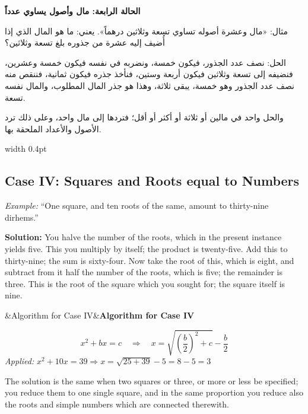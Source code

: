 \documentclass[11pt,a4paper,openany,oneside]{book}
\newenvironment{mathbox}[1][]{%
  \smallskip\par\noindent
  \begin{lrbox}{\mathboxsave}
  \begin{minipage}{\dimexpr\linewidth-2\fboxsep-2\fboxrule\relax}%
  \setlength{\parskip}{0.3em}%
  \ifx&#1&\else\textbf{#1}\\[0.2cm]\fi
}{%
  \end{minipage}%
  \end{lrbox}
  \fcolorbox{sectioncolor}{mathbg}{\usebox{\mathboxsave}}%
  \smallskip}
\begin{document}
\noindent\begin{minipage}[t]{0.48\textwidth}
\raggedleft

\begin{Arabic}
\textbf{الحالة الرابعة: مال وأصول يساوي عدداً}

مثال: «مال وعشرة أصوله تساوي تسعة وثلاثين درهماً». يعني: ما هو المال الذي إذا أُضيف إليه عشرة من جذوره بلغ تسعة وثلاثين؟

الحل: نصف عدد الجذور، فيكون خمسة، ونضربه في نفسه فيكون خمسة وعشرين، فنضيفه إلى تسعة وثلاثين فيكون أربعة وستين، فنأخذ جذره فيكون ثمانية، فننقص منه نصف عدد الجذور وهو خمسة، يبقى ثلاثة، وهذا هو جذر المال المطلوب، والمال نفسه تسعة.

والحل واحد في مالين أو ثلاثة أو أكثر أو أقل؛ فتردها إلى مال واحد، وعلى ذلك ترد الأصول والأعداد الملحقة بها.
\end{Arabic}

\end{minipage}%
\hfill\vrule width 0.4pt\hfill
\begin{minipage}[t]{0.48\textwidth}
\raggedright

\subsection*{Case IV: Squares and Roots equal to Numbers}

\textit{Example:} ``One square, and ten roots of the same, amount to thirty-nine dirhems.''

\textbf{Solution:} You halve the number of the roots, which in the present instance yields five. This you multiply by itself; the product is twenty-five. Add this to thirty-nine; the sum is sixty-four. Now take the root of this, which is eight, and subtract from it half the number of the roots, which is five; the remainder is three. This is the root of the square which you sought for; the square itself is nine.

\begin{mathbox}[Algorithm for Case IV]
\begin{equation}
x^2 + bx = c \quad\Longrightarrow\quad x = \sqrt{\left(\frac{b}{2}\right)^2 + c} - \frac{b}{2}
\end{equation}
\textit{Applied:} $x^2 + 10x = 39 \Rightarrow x = \sqrt{25 + 39} - 5 = 8 - 5 = 3$
\end{mathbox}

The solution is the same when two squares or three, or more or less be specified; you reduce them to one single square, and in the same proportion you reduce also the roots and simple numbers which are connected therewith.

\end{minipage}
\vspace{0.3cm}
\end{document}
